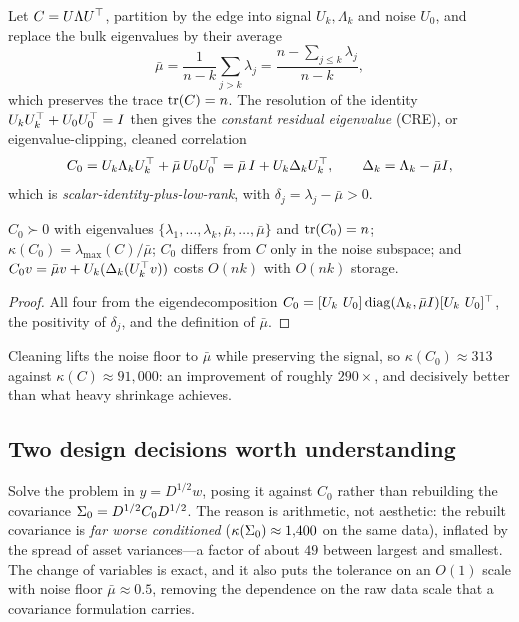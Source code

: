 Let $C = U\Lambda U^{\top}$, partition by the edge into signal $U_k, \Lambda_k$ and noise
$U_0$, and replace the bulk eigenvalues by their average
\[
  \bar\mu = \frac{1}{n-k}\sum_{j>k}\lambda_j = \frac{n - \sum_{j\le k}\lambda_j}{n-k},
\]
which preserves the trace $\operatorname{tr}(C) = n$. The resolution of the identity
$U_kU_k^{\top} + U_0U_0^{\top} = I$ then gives the \emph{constant residual eigenvalue} (CRE), or
eigenvalue-clipping, cleaned correlation \cite{laloux1999,bun2017,lopezdeprado2018}
\begin{equation}
  C_0 = U_k\Lambda_k U_k^{\top} + \bar\mu\,U_0U_0^{\top} = \bar\mu\,I + U_k\Delta_k U_k^{\top},
  \qquad \Delta_k = \Lambda_k - \bar\mu I,
  \label{eq:cre}
\end{equation}
which is \emph{scalar-identity-plus-low-rank}, with $\delta_j = \lambda_j - \bar\mu > 0$.

\begin{proposition}
\label{prop:rmt_spectrum}
$C_0 \succ 0$ with eigenvalues $\{\lambda_1,\dots,\lambda_k,\bar\mu,\dots,\bar\mu\}$
and $\operatorname{tr}(C_0) = n$; $\kappa(C_0) = \lambda_{\max}(C)/\bar\mu$; $C_0$ differs from $C$
only in the noise subspace; and $C_0 v = \bar\mu v + U_k(\Delta_k(U_k^{\top} v))$ costs
$O(nk)$ with $O(nk)$ storage.
\end{proposition}

\begin{proof}
All four from the eigendecomposition
$C_0 = [U_k\ U_0]\diag(\Lambda_k,\bar\mu I)[U_k\ U_0]\T$, the positivity of
$\delta_j$, and the definition of $\bar\mu$.
\end{proof}

Cleaning lifts the noise floor to $\bar\mu$ while preserving the signal, so
$\kappa(C_0) \approx 313$ against $\kappa(C) \approx 91{,}000$: an improvement of
roughly $290\times$, and decisively better than what heavy shrinkage achieves.

\subsection{Two design decisions worth understanding}

\begin{remark}
\label{rem:standardised}
Solve the problem in $y = D^{1/2}w$, posing it against $C_0$ rather than rebuilding the
covariance $\Sigma_0 = D^{1/2}C_0D^{1/2}$. The reason is arithmetic, not aesthetic: the
rebuilt covariance is \emph{far worse conditioned} ($\kappa(\Sigma_0) \approx 1{,}400$ on
the same data), inflated by the spread of asset variances---a factor of about $49$
between largest and smallest. The change of variables is exact, and it also puts the
tolerance on an $O(1)$ scale with noise floor $\bar\mu \approx 0.5$, removing the
dependence on the raw data scale that a covariance formulation carries.
\end{remark}

